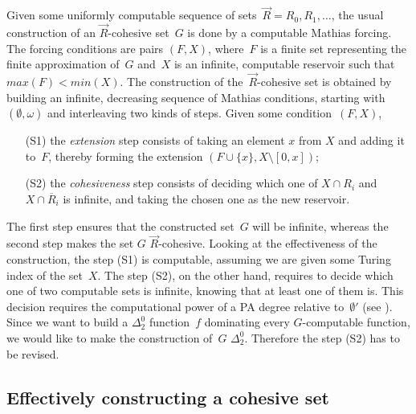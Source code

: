 Given some uniformly computable sequence of sets~$\vec{R} = R_0, R_1, \dots$,
the usual construction of an $\vec{R}$-cohesive set~$G$ is done by a computable Mathias forcing.
The forcing conditions are pairs $(F,X)$, where~$F$ is a finite set representing the finite
approximation of~$G$ and~$X$ is an infinite, computable reservoir such that~$max(F) < min(X)$.
The construction of the~$\vec{R}$-cohesive set is obtained by building
an infinite, decreasing sequence of Mathias conditions, starting with~$(\emptyset, \omega)$
and interleaving two kinds of steps.
Given some condition~$(F,X)$,
\begin{itemize}
	\item[(S1)] the \emph{extension} step consists of taking an element $x$ from $X$ and adding it to~$F$,
	thereby forming the extension $(F \cup \{x\}, X \setminus [0,x])$;
	\item[(S2)] the \emph{cohesiveness} step consists of deciding which one of $X \cap R_i$
	and $X \cap \overline{R}_i$ is infinite, and taking the chosen one as the new reservoir.
\end{itemize}
The first step ensures that the constructed set~$G$ will be infinite, whereas
the second step makes the set $G$ $\vec{R}$-cohesive.
Looking at the effectiveness of the construction, the step (S1) is computable,
assuming we are given some Turing index of the set~$X$.
The step (S2), on the other hand, requires to decide which one of two computable sets
is infinite, knowing that at least one of them is. This decision
requires the computational power of a PA degree relative to~$\emptyset'$ (see \cite[Lemma 4.2]{Cholak2001strength}).
Since we want to build a $\Delta^0_2$ function~$f$ dominating every $G$-computable function,
we would like to make the construction of~$G$ $\Delta^0_2$. Therefore the step (S2) has to be revised.

\subsection{Effectively constructing a cohesive set}

